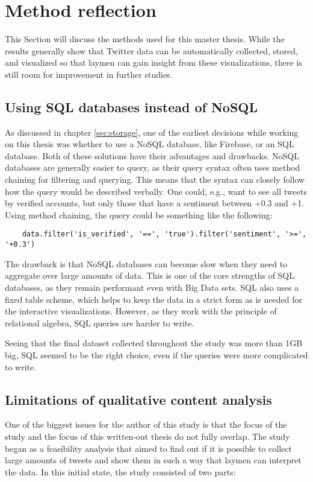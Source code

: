 \section{Method reflection}
This Section will discuss the methods used for this master thesis. While the results generally show that Twitter data can be automatically collected, stored, and visualized so that laymen can gain insight from these visualizations, there is still room for improvement in further studies.

\subsection*{Using SQL databases instead of NoSQL}
As discussed in chapter \ref{sec:storage}, one of the earliest decisions while working on this thesis was whether to use a NoSQL database, like Firebase, or an SQL database. Both of these solutions have their advantages and drawbacks. NoSQL databases are generally easier to query, as their query syntax often uses method chaining for filtering and querying. This means that the syntax can closely follow how the query would be described verbally. One could, e.g., want to see all tweets by verified accounts, but only those that have a sentiment between +0.3 and +1. Using method chaining, the query could be something like the following:

\begin{verbatim}
    data.filter('is_verified', '==', 'true').filter('sentiment', '>=', '+0.3')
\end{verbatim}

The drawback is that NoSQL databases can become slow when they need to aggregate over large amounts of data. This is one of the core strengths of SQL databases, as they remain performant even with Big Data sets. SQL also uses a fixed table scheme, which helps to keep the data in a strict form as is needed for the interactive visualizations. However, as they work with the principle of relational algebra, SQL queries are harder to write.

Seeing that the final dataset collected throughout the study was more than 1GB big, SQL seemed to be the right choice, even if the queries were more complicated to write.

\subsection*{Limitations of qualitative content analysis}
One of the biggest issues for the author of this study is that the focus of the study and the focus of this written-out thesis do not fully overlap. The study began as a feasibility analysis that aimed to find out if it is possible to collect large amounts of tweets and show them in such a way that laymen can interpret the data. In this initial state, the study consisted of two parts:

